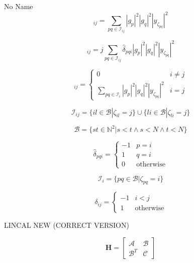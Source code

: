\documentclass[a4paper,10pt]{article}
\begin{document}
\begin{section}{No Name}
\begin{equation}
[\boldsymbol{\mathcal{G}}]_{ij} = \sum_{pq\in\mathcal{I}_{ij}} |g_p|^2|g_q|^2|y_{\zeta_{pq}}|^2
\end{equation}

\begin{equation}
[\boldsymbol{\mathcal{H}}]_{ij} = j \sum_{pq\in\mathcal{I}_{ij}} \widehat{\delta}_{pqi} |g_p|^2|g_q|^2|y_{\zeta_{pq}}|^2
\end{equation}

\begin{equation}
 [\boldsymbol{\mathcal{K}}]_{ij} = 
\begin{cases}
0 & i\neq j\\
\sum_{pq\in\mathcal{I}_{i}} |g_p|^2|g_q|^2|y_{\zeta_{pq}}|^2 & i=j
\end{cases}
\end{equation}

\begin{equation}
\mathcal{I}_{ij} = \{il\in\mathcal{B}|\zeta_{il}=j\}\cup\{li\in\mathcal{B}|\zeta_{li}=j\} 
\end{equation}

\begin{equation}
\mathcal{B} = \{st\in\mathbb{N}^2|s<t \wedge s<N \wedge t<N\}
\end{equation}

\begin{equation}
\widehat{\delta}_{pqi} = 
\begin{cases}
-1 & p = i\\
1 & q = i\\
0 & \textrm{otherwise}
\end{cases}
\end{equation}

\begin{equation}
\mathcal{I}_i = \{pq\in\mathcal{B}|\zeta_{pq}=i\} 
\end{equation}

\begin{equation}
\delta_{ij} =
\begin{cases}
-1 & i<j\\
1 & \textrm{otherwise}
\end{cases}
\end{equation}

LINCAL NEW (CORRECT VERSION)

\begin{equation}
\boldsymbol{H} =
\begin{bmatrix}
\boldsymbol{\mathcal{A}} & \boldsymbol{\mathcal{B}}\\
\boldsymbol{\mathcal{B}}^T & \boldsymbol{\mathcal{C}}
\end{bmatrix}
\end{equation}


\end{section}
\end{document}
